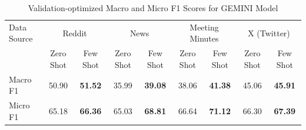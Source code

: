 \begin{table}[htbp]
\centering
\begin{tabular}{l *{8}{c}}
\toprule
Data Source & \multicolumn{2}{c}{Reddit} & \multicolumn{2}{c}{News} & \multicolumn{2}{c}{Meeting Minutes} & \multicolumn{2}{c}{X (Twitter)} \\
& Zero Shot & Few Shot & Zero Shot & Few Shot & Zero Shot & Few Shot & Zero Shot & Few Shot \\
\midrule
Macro F1 & 50.90 & \textbf{51.52} & 35.99 & \textbf{39.08} & 38.06 & \textbf{41.38} & 45.06 & \textbf{45.91} \\
Micro F1 & 65.18 & \textbf{66.36} & 65.03 & \textbf{68.81} & 66.64 & \textbf{71.12} & 66.30 & \textbf{67.39} \\
\bottomrule
\end{tabular}
\centering\caption{Validation-optimized Macro and Micro F1 Scores for GEMINI Model}
\label{tab:gemini_macro_micro}
\end{table}